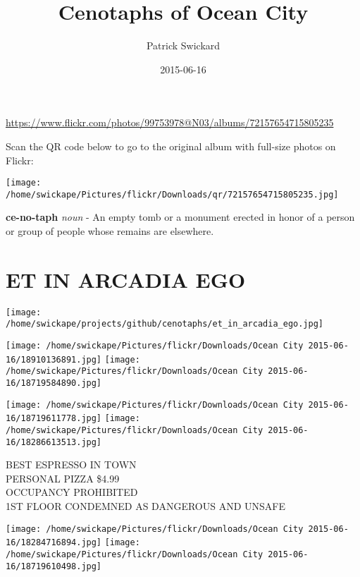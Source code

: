 \documentclass[10pt,letterpaper]{article}
\title{Cenotaphs of Ocean City}
\author{Patrick Swickard}
\date{2015-06-16}
\begin{document}
\maketitle

\url{https://www.flickr.com/photos/99753978@N03/albums/72157654715805235}

Scan the QR code below to go to the original album with full-size photos on Flickr:

\texttt{[image: /home/swickape/Pictures/flickr/Downloads/qr/72157654715805235.jpg]}
\pagebreak

\newpage\null\thispagestyle{empty}\newpage

\pagebreak

\vspace*{4in}
\textbf{ce-no-taph} \textit{noun} - An empty tomb or a monument erected in honor of a person or group of people whose remains are elsewhere.

\newpage\null\thispagestyle{empty}\newpage

\pagebreak

\vspace*{3in}
\section*{ET IN ARCADIA EGO}
\vspace*{1in}
\texttt{[image: /home/swickape/projects/github/cenotaphs/et\_in\_arcadia\_ego.jpg]}


\pagebreak

\newpage\null\thispagestyle{empty}\newpage

\pagebreak
\texttt{[image: /home/swickape/Pictures/flickr/Downloads/Ocean City 2015-06-16/18910136891.jpg]}
\texttt{[image: /home/swickape/Pictures/flickr/Downloads/Ocean City 2015-06-16/18719584890.jpg]}

\texttt{[image: /home/swickape/Pictures/flickr/Downloads/Ocean City 2015-06-16/18719611778.jpg]}
\texttt{[image: /home/swickape/Pictures/flickr/Downloads/Ocean City 2015-06-16/18286613513.jpg]}

BEST ESPRESSO IN TOWN\\
PERSONAL PIZZA \$4.99\\
OCCUPANCY PROHIBITED\\
1ST FLOOR CONDEMNED AS DANGEROUS AND UNSAFE
\pagebreak

\texttt{[image: /home/swickape/Pictures/flickr/Downloads/Ocean City 2015-06-16/18284716894.jpg]}
\texttt{[image: /home/swickape/Pictures/flickr/Downloads/Ocean City 2015-06-16/18719610498.jpg]}
\end{document}
